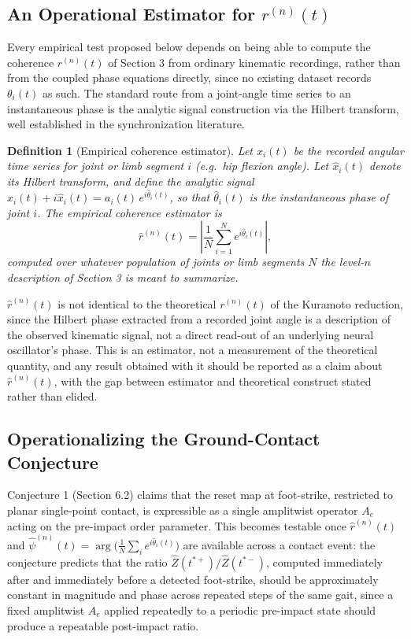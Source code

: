 \documentclass[12pt]{article}
\newtheorem{definition}{Definition}
\begin{document}
\subsection{An Operational Estimator for $r^{(n)}(t)$}

Every empirical test proposed below depends on being able to compute the coherence $r^{(n)}(t)$ of Section 3 from ordinary kinematic recordings, rather than from the coupled phase equations directly, since no existing dataset records $\theta_i(t)$ as such. The standard route from a joint-angle time series to an instantaneous phase is the analytic signal construction via the Hilbert transform, well established in the synchronization literature.

\begin{definition}[Empirical coherence estimator]
Let $x_i(t)$ be the recorded angular time series for joint or limb segment $i$ (e.g.\ hip flexion angle). Let $\hat x_i(t)$ denote its Hilbert transform, and define the analytic signal $x_i(t) + i\hat x_i(t) = a_i(t)\, e^{i\hat\theta_i(t)}$, so that $\hat\theta_i(t)$ is the instantaneous phase of joint $i$. The empirical coherence estimator is
\[
\hat r^{(n)}(t) = \left| \frac{1}{N}\sum_{i=1}^N e^{i\hat\theta_i(t)} \right|,
\]
computed over whatever population of joints or limb segments $N$ the level-$n$ description of Section 3 is meant to summarize.
\end{definition}

$\hat r^{(n)}(t)$ is not identical to the theoretical $r^{(n)}(t)$ of the Kuramoto reduction, since the Hilbert phase extracted from a recorded joint angle is a description of the observed kinematic signal, not a direct read-out of an underlying neural oscillator's phase. This is an estimator, not a measurement of the theoretical quantity, and any result obtained with it should be reported as a claim about $\hat r^{(n)}(t)$, with the gap between estimator and theoretical construct stated rather than elided.

\subsection{Operationalizing the Ground-Contact Conjecture}

Conjecture 1 (Section 6.2) claims that the reset map at foot-strike, restricted to planar single-point contact, is expressible as a single amplitwist operator $A_e$ acting on the pre-impact order parameter. This becomes testable once $\hat r^{(n)}(t)$ and $\hat\psi^{(n)}(t) = \arg\big(\frac{1}{N}\sum_i e^{i\hat\theta_i(t)}\big)$ are available across a contact event: the conjecture predicts that the ratio $\hat Z(t^{*+}) / \hat Z(t^{*-})$, computed immediately after and immediately before a detected foot-strike, should be approximately constant in magnitude and phase across repeated steps of the same gait, since a fixed amplitwist $A_e$ applied repeatedly to a periodic pre-impact state should produce a repeatable post-impact ratio.
\end{document}
